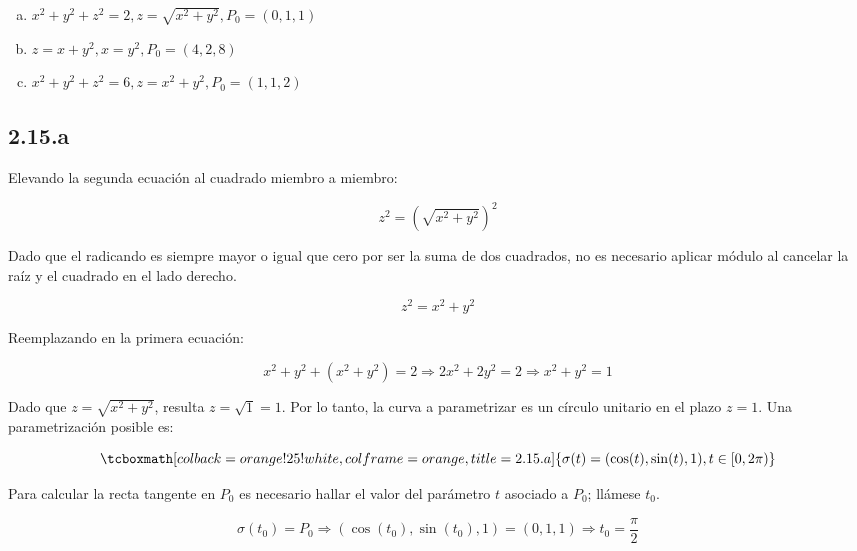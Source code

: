 \documentclass{article}
\begin{document}
\begin{enumerate}[(a)]
\bfseries

\item $x^2 + y^2 + z^2 = 2, z = \sqrt{x^2 + y^2}, P_0 = (0, 1, 1)$

\item $z = x + y^2, x = y^2, P_0 = (4, 2, 8)$

\item $x^2 + y^2 + z^2 = 6, z = x^2 + y^2, P_0 = (1, 1, 2)$

\end{enumerate}

\subsection*{2.15.a}
\label{subsec:2.15.a}

Elevando la segunda ecuación al cuadrado miembro a miembro:

\begin{equation}
z^2 = (\sqrt{ x^2+y^2 })^2
\end{equation}

Dado que el radicando es siempre mayor o igual que cero por ser la suma de dos cuadrados, no es necesario aplicar módulo al cancelar la raíz y el cuadrado en el lado derecho.

\begin{equation}
z^2 = x^2 + y^2
\end{equation}

Reemplazando en la primera ecuación:

\begin{equation}
x^2 + y^2 + (x^2 + y^2) = 2 \Rightarrow 2x^2 + 2y^2 = 2 \Rightarrow x^2 + y^2 = 1
\end{equation}

Dado que $z = \sqrt{x^2 + y^2}$, resulta $z = \sqrt{1} = 1$. Por lo tanto, la curva a parametrizar es un círculo unitario en el plazo $z=1$. Una parametrización posible es:

\begin{equation}
\tcboxmath[colback=orange!25!white,colframe=orange,title=2.15.a]
{
\sigma(t) = (\cos(t), \sin(t), 1), t \in [0, 2\pi)
}
\end{equation}

Para calcular la recta tangente en $P_0$ es necesario hallar el valor del parámetro $t$ asociado a $P_0$; llámese $t_0$.

\begin{equation}
\sigma(t_0) = P_0 \Rightarrow (\cos(t_0), \sin(t_0), 1) = (0, 1, 1) \Rightarrow t_0 = \frac{\pi}{2}
\end{equation}
\end{document}
